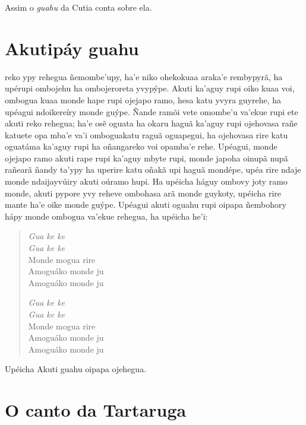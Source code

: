 Assim o \textit{guahu} da Cutia conta sobre ela.

\chapter{Akutipáy guahu}

 reko ypy rehegua ñemombe'upy, ha'e niko ohekokuaa araka'e
rembypyrã, ha upérupi ombojehu ha ombojeroreta yvypýpe. Akuti ka'aguy
rupi oiko kuaa voi, ombogua kuaa monde hape rupi ojejapo ramo, hesa katu
yvyra guyrehe, ha upéagui ndoikereíry monde guýpe. Ñande ramõi vete
omombe'u va'ekue rupi ete akuti reko rehegua; ha'e osẽ oguata ha okaru
haguã ka'aguy rupi ojehovasa rañe katuete opa mba'e va'i omboguakatu
raguã oguapegui, ha ojehovasa rire katu oguatáma ka'aguy rupi ha
oñangareko voi opamba'e rehe. Upéagui, monde ojejapo ramo akuti rape
rupi ka'aguy mbyte rupi, monde japoha oinupã nupã rañearã ñandy ta'ypy
ha uperire katu oñakã upi haguã mondépe, upéa rire ndaje monde
ndaijayvúiry akuti oúramo hupi. Ha upéicha háguy ombovy joty ramo monde,
akuti pypore yvy reheve ombohasa arã monde guykoty, upéicha rire mante
ha'e oike monde guýpe. Upéagui akuti oguahu rupi oipapa ñembohory hápy
monde ombogua va'ekue rehegua, ha upéicha he'i:

\begin{verse}
\textit{Gua ke ke}\\
\textit{Gua ke ke}\\
Monde mogua rire\\
Amoguáko monde ju\\
Amoguáko monde ju
       
\textit{Gua ke ke}\\
\textit{Gua ke ke}\\
Monde mogua rire\\
Amoguáko monde ju\\ \EP[1]
Amoguáko monde ju 
\end{verse}

Upéicha Akuti guahu oipapa ojehegua.

\chapter{O canto da Tartaruga}

